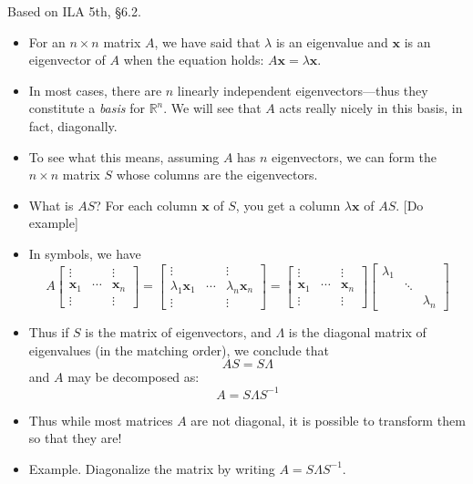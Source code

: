 \documentclass[11pt,oneside]{amsbook}
\newcommand{\RR}{\mathbb R}
\theoremstyle{definition}
\theoremstyle{plain}
\theoremstyle{definition}
\theoremstyle{remark}
\numberwithin{equation}{section}
\numberwithin{figure}{section}
\begin{document}
Based on ILA 5th, \S 6.2.

\begin{itemize}
\item For an $n\times n$ matrix $A$, we have said that $\lambda$ is an eigenvalue and $\mathbf{x}$ is an eigenvector of $A$ when the equation holds: $A\mathbf{x}=\lambda\mathbf{x}$.
\item In most cases, there are $n$ linearly independent eigenvectors---thus they constitute a \emph{basis} for $\RR^n$. We will see that $A$ acts really nicely in this basis, in fact, diagonally.
\item To see what this means, assuming $A$ has $n$ eigenvectors, we can form the $n\times n$ matrix $S$ whose columns are the eigenvectors.
\item What is $AS$? For each column $\mathbf{x}$ of $S$, you get a column $\lambda\mathbf{x}$ of $AS$. [Do example]
\item In symbols, we have
  \[A\begin{bmatrix}
      \vdots&&\vdots\\
      \mathbf{x}_1&\cdots&\mathbf{x}_n\\
      \vdots&&\vdots
    \end{bmatrix}
    =\begin{bmatrix}
      \vdots&&\vdots\\
      \lambda_1\mathbf{x}_1&\cdots&\lambda_n\mathbf{x}_n\\
      \vdots&&\vdots
    \end{bmatrix}
    =\begin{bmatrix}
      \vdots&&\vdots\\
      \mathbf{x}_1&\cdots&\mathbf{x}_n\\
      \vdots&&\vdots
    \end{bmatrix}
    \begin{bmatrix}
      \lambda_1\\&\ddots&\\&&\lambda_n
    \end{bmatrix}
  \]
  \item Thus if $S$ is the matrix of eigenvectors, and $\Lambda$ is the diagonal matrix of eigenvalues (in the matching order), we conclude that
  \[AS=S\Lambda
  \]
  and $A$ may be decomposed as:
  \[A=S\Lambda S^{-1}
  \]
\item Thus while most matrices $A$ are not diagonal, it is possible to transform them so that they are!
\item Example. Diagonalize the matrix by writing $A=S\Lambda S^{-1}$.

\end{itemize}
\end{document}
